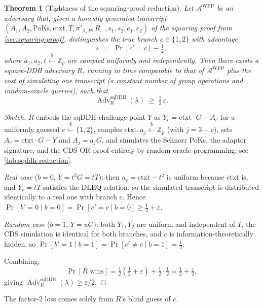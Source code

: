 \documentclass[11pt]{article}
\newtheorem{theorem}{Theorem}
\begin{document}
\begin{theorem}[Tightness of the squaring-proof reduction]
\label{thm:sqddh-reduction}
Let $\mathcal{A}^{\mathrm{WFP}}$ be an adversary that, given a honestly
generated transcript
$(A_{1},A_{2},\mathrm{PoKs},\textrm{ctxt},T,\sigma'_{A,P},R_{\cdot\cdot},s_{1},s_{2},e_{1},e_{2})$
of the squaring proof from \autoref{sec:squaring-proof},
distinguishes the true branch $c\in\{1,2\}$ with advantage
$$
  \varepsilon
  \;=\;
  \Pr[c'=c]-\tfrac{1}{2},
$$
where $a_{1},a_{2},t\xleftarrow{\$}\mathbb{Z}_{p}$ are sampled uniformly
and independently. Then there exists a square-DDH adversary $R$,
running in time comparable to that of $\mathcal{A}^{\mathrm{WFP}}$ plus
the cost of simulating one transcript (a constant number of group
operations and random-oracle queries), such that
$$
  \operatorname{Adv}^{\mathrm{sqDDH}}_{R}(\lambda)
  \;\geq\;
  \tfrac{1}{2}\,\varepsilon.
$$
\end{theorem}

\begin{proof}[Sketch]
$R$ embeds the sqDDH challenge point $Y$ as $Y_{c}=\textrm{ctxt}\cdot G-A_{c}$
for a uniformly guessed $c\xleftarrow{\$}\{1,2\}$, samples
$\textrm{ctxt},a_{j}\xleftarrow{\$}\mathbb{Z}_{p}$ (with $j=3-c$),
sets $A_{c}=\textrm{ctxt}\cdot G-Y$ and $A_{j}=a_{j}G$,
and simulates the Schnorr PoKs, the adaptor signature, and the
CDS OR proof entirely by random-oracle programming; see
\autoref{tab:sqddh-reduction}.

\emph{Real case} ($b=0$, $Y=t^{2}G=tT$): then
$a_{c}=\textrm{ctxt}-t^{2}$ is uniform because $\textrm{ctxt}$ is,
and $Y_{c}=tT$ satisfies the DLEQ relation, so the simulated transcript
is distributed identically to a real one with branch $c$. Hence
$\Pr[b'=0\mid b=0]=\Pr[c'=c\mid b=0]\geq\tfrac{1}{2}+\varepsilon$.

\emph{Random case} ($b=1$, $Y=uG$): both $Y_{1},Y_{2}$ are uniform
and independent of $T$, the CDS simulation is identical for both
branches, and $c$ is information-theoretically hidden, so
$\Pr[b'=1\mid b=1]=\Pr[c'\neq c\mid b=1]=\tfrac{1}{2}$.

Combining,
$$
  \Pr[R\text{ wins}]
  =\tfrac{1}{2}\!\left(\tfrac{1}{2}+\varepsilon\right)
   +\tfrac{1}{2}\cdot\tfrac{1}{2}
  =\tfrac{1}{2}+\tfrac{\varepsilon}{2},
$$
giving $\operatorname{Adv}^{\mathrm{sqDDH}}_{R}(\lambda)\geq\varepsilon/2$.
\end{proof}

The factor-$2$ loss comes solely from $R$'s blind guess of $c$.
\end{document}
